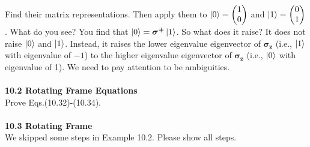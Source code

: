 \documentclass{article}
\begin{document}
Find their matrix representations. Then apply them to $\ket{0}=\begin{pmatrix}
    1\\0
\end{pmatrix}$ and $\ket{1}=\begin{pmatrix}
    0\\1
\end{pmatrix}$. What do you see? You find that $\ket{0}=\boldsymbol{\sigma^+}\ket{1}$.
So what does it raise? It does not raise $\ket{0}$ and $\ket{1}$. Instead, it raises
the lower eigenvalue eigenvector of $\boldsymbol{\sigma_z}$ (i.e., $\ket{1}$ with eigenvalue
of $-1$) to the higher eigenvalue eigenvector of $\boldsymbol{\sigma_z}$ (i.e., $\ket{0}$
with eigenvalue of 1). We need to pay attention to be ambiguities.\\\\
\textbf{10.2 Rotating Frame Equations}\\
Prove Eqs.(10.32)-(10.34).\\\\
\textbf{10.3 Rotating Frame}\\
We skipped some steps in Example 10.2. Please show all steps.
\end{document}
